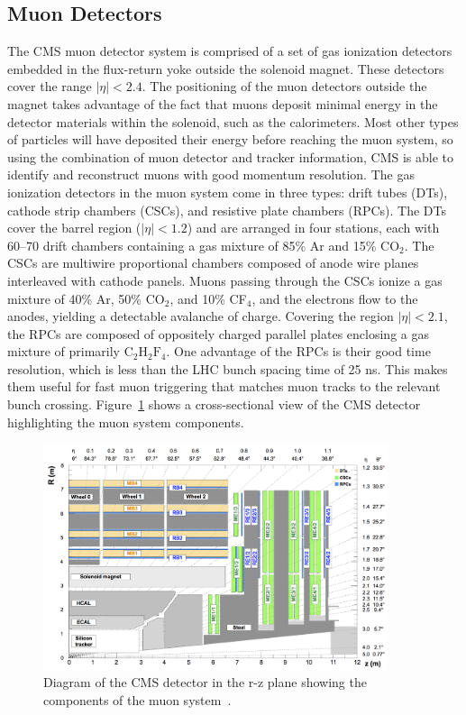 \subsection{Muon Detectors}
The CMS muon detector system is comprised of a set of gas ionization detectors embedded in the flux-return yoke outside the solenoid magnet. 
These detectors cover the range $|\eta| < 2.4$. The positioning of the muon detectors outside the magnet takes advantage of the fact that muons deposit minimal energy in the detector 
materials within the solenoid, such as the calorimeters. Most other types of particles will have deposited their energy before reaching the muon system, so using the combination of muon detector and tracker information, CMS is able to identify and reconstruct muons with good momentum resolution. The gas ionization detectors in the muon system come in three types: drift tubes (DTs), cathode strip chambers (CSCs), and 
resistive plate chambers (RPCs). The DTs cover the barrel region ($|\eta| < 1.2$) and are arranged in four stations, each with 60--70 drift chambers containing a gas mixture of 85\% Ar and 15\% CO$_2$.
The CSCs are multiwire proportional chambers composed of anode wire planes interleaved with cathode panels. Muons passing through the CSCs ionize a gas mixture of 40\% Ar, 50\% CO$_2$, and 10\% CF$_4$, 
and the electrons flow to the anodes, yielding a detectable avalanche of charge. Covering the region $|\eta| < 2.1$, the RPCs are composed of oppositely charged parallel plates enclosing a gas mixture 
of primarily $\mathrm{C}_2\mathrm{H}_2\mathrm{F}_4$. One advantage of the RPCs is their good time resolution, which is less than the LHC bunch spacing time of 25 ns. This makes them useful for fast muon triggering that matches
muon tracks to the relevant bunch crossing. Figure~\ref{fig:muon_system} shows a cross-sectional view of the CMS detector highlighting the muon system components. 

\begin{figure}[tb]
  \centering
   \includegraphics[width=0.9\textwidth]{fig/experiment/detector/muon_sys_r-z.png}
	\caption[Diagram of the CMS detector in the r-z plane showing the components of the muon system.]
	{Diagram of the CMS detector in the r-z plane showing the components of the muon system~\cite{CMS:2008xjf}.}
	\label{fig:muon_system}
\end{figure}

